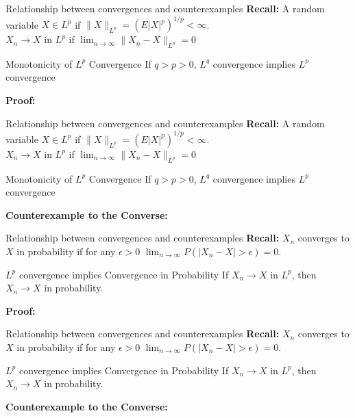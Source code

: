 \documentclass [aspectratio=169]{beamer}
\begin{document}
\begin{frame}{Relationship between convergences and counterexamples}
    \textbf{Recall:} A random variable $X \in L^p$ if $\|X\|_{L^p} = (E |X|^p)^{1/p} < \infty$.\\ 
    \quad \qquad $X_n\to X$ in $L^p$ if $\lim_{n\to \infty}\|X_n - X\|_{L^p}=0$ \\
    \begin{block}{Monotonicity of $L^p$ Convergence}
    If $q>p>0$, $L^q$ convergence implies $L^p$ convergence 
    \end{block}
    \textbf{Proof: }
    \vspace{1.8in}
\end{frame}

\begin{frame}{Relationship between convergences and counterexamples}
    \textbf{Recall:} A random variable $X \in L^p$ if $\|X\|_{L^p} = (E |X|^p)^{1/p} < \infty$.\\ 
    \quad \qquad $X_n\to X$ in $L^p$ if $\lim_{n\to \infty}\|X_n - X\|_{L^p}=0$ \\
    \begin{block}{Monotonicity of $L^p$ Convergence}
    If $q>p>0$, $L^q$ convergence implies $L^p$ convergence 
    \end{block}
    \textbf{Counterexample to the Converse: }
    \vspace{1.8in}
\end{frame}

\begin{frame}{Relationship between convergences and counterexamples}
    \textbf{Recall:} $X_n$ converges to $X$ in probability if for any $\epsilon>0$ $\lim_{n\to \infty}P(|X_n - X|>\epsilon)=0$.\\
    \begin{block}{$L^p$ convergence implies Convergence in Probability}
    If $X_n \to X$ in $L^p$, then $X_n \to X$ in probability. 
    \end{block}
    \textbf{Proof: }
    \vspace{1.8in}
\end{frame}

\begin{frame}{Relationship between convergences and counterexamples}
    \textbf{Recall:} $X_n$ converges to $X$ in probability if for any $\epsilon>0$ $\lim_{n\to \infty}P(|X_n - X|>\epsilon)=0$.\\
    \begin{block}{$L^p$ convergence implies Convergence in Probability}
    If $X_n \to X$ in $L^p$, then $X_n \to X$ in probability. 
    \end{block}
    \textbf{Counterexample to the Converse: }
    \vspace{1.8in}
\end{frame}
\end{document}
